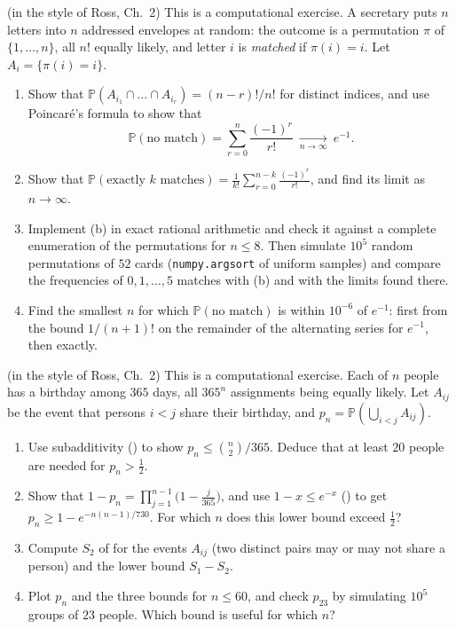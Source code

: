 \begin{exercise}\label{ex:ms-matching}
\medium (in the style of Ross, Ch.~2) This is a computational exercise. A secretary puts $n$
letters into $n$ addressed envelopes at random: the outcome is a permutation $\pi$ of
$\{1,\dots,n\}$, all $n!$ equally likely, and letter $i$ is \emph{matched} if $\pi(i)=i$. Let
$A_i=\{\pi(i)=i\}$.
\begin{enumerate}[label=(\alph*)]
  \item Show that $\mathbb P(A_{i_1}\cap\dots\cap A_{i_r})=(n-r)!/n!$ for distinct indices, and
    use Poincar\'e's formula to show that
    \[
      \mathbb P(\text{no match})=\sum_{r=0}^n\frac{(-1)^r}{r!}\ \xrightarrow[n\to\infty]{}\ e^{-1}.
    \]
  \item Show that $\mathbb P(\text{exactly }k\text{ matches})=\frac1{k!}\sum_{r=0}^{n-k}\frac{(-1)^r}{r!}$,
    and find its limit as $n\to\infty$.
  \item Implement (b) in exact rational arithmetic and check it against a complete enumeration
    of the permutations for $n\le8$. Then simulate $10^5$ random permutations of $52$ cards
    (\texttt{numpy.argsort} of uniform samples) and compare the frequencies of $0,1,\dots,5$
    matches with (b) and with the limits found there.
  \item Find the smallest $n$ for which $\mathbb P(\text{no match})$ is within $10^{-6}$ of
    $e^{-1}$: first from the bound $1/(n+1)!$ on the remainder of the alternating series for
    $e^{-1}$, then exactly.
\end{enumerate}
\end{exercise}

\begin{exercise}\label{ex:ms-birthday}
\easy (in the style of Ross, Ch.~2) This is a computational exercise. Each of $n$ people has a
birthday among $365$ days, all $365^n$ assignments being equally likely. Let $A_{ij}$ be the
event that persons $i<j$ share their birthday, and $p_n=\mathbb P(\bigcup_{i<j}A_{ij})$.
\begin{enumerate}[label=(\alph*)]
  \item Use subadditivity () to show $p_n\le\binom n2/365$.
    Deduce that at least $20$ people are needed for $p_n>\frac12$.
  \item Show that $1-p_n=\prod_{j=1}^{n-1}\big(1-\frac j{365}\big)$, and use $1-x\le e^{-x}$
    () to get $p_n\ge1-e^{-n(n-1)/730}$. For which $n$ does this lower
    bound exceed $\frac12$?
  \item Compute $S_2$ of  for the events $A_{ij}$ (two distinct pairs
    may or may not share a person) and the lower bound $S_1-S_2$.
  \item Plot $p_n$ and the three bounds for $n\le60$, and check $p_{23}$ by simulating
    $10^5$ groups of $23$ people. Which bound is useful for which $n$?
\end{enumerate}
\end{exercise}

